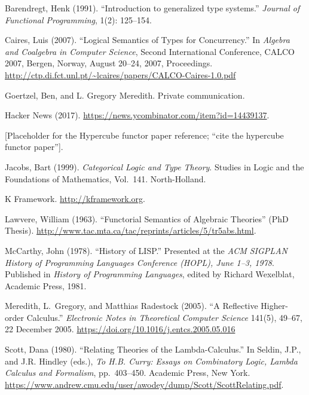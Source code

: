 \documentclass{article}
\begin{document}
\begin{thebibliography}{99}

Barendregt, Henk (1991). 
``Introduction to generalized type systems.''  
\emph{Journal of Functional Programming}, 1(2): 125--154.

Caires, Luis (2007). 
``Logical Semantics of Types for Concurrency.'' 
In \emph{Algebra and Coalgebra in Computer Science}, 
Second International Conference, CALCO 2007, Bergen, Norway, August 20--24, 2007, Proceedings.
\url{http://ctp.di.fct.unl.pt/~lcaires/papers/CALCO-Caires-1.0.pdf}

Goertzel, Ben, and L. Gregory Meredith. Private communication.

Hacker News (2017). 
\url{https://news.ycombinator.com/item?id=14439137}.

[Placeholder for the Hypercube functor paper reference; “cite the hypercube functor paper”].

Jacobs, Bart (1999).  
\textit{Categorical Logic and Type Theory}.  
Studies in Logic and the Foundations of Mathematics, Vol.\ 141.  
North-Holland.

K Framework.
\url{http://kframework.org}.

Lawvere, William (1963). 
``Functorial Semantics of Algebraic Theories'' (PhD Thesis). 
\url{http://www.tac.mta.ca/tac/reprints/articles/5/tr5abs.html}.

McCarthy, John (1978). 
``History of LISP.'' 
Presented at the \textit{ACM SIGPLAN History of Programming Languages Conference (HOPL), June 1--3, 1978}.  
Published in \textit{History of Programming Languages},  
edited by Richard Wexelblat,  
Academic Press, 1981.

Meredith, L.~Gregory, and Matthias Radestock (2005). 
``A Reflective Higher-order Calculus.'' 
\emph{Electronic Notes in Theoretical Computer Science} 141(5), 49--67, 22 December 2005. 
\url{https://doi.org/10.1016/j.entcs.2005.05.016}

Scott, Dana (1980). 
``Relating Theories of the Lambda-Calculus.'' 
In Seldin, J.P., and J.R. Hindley (eds.), 
\textit{To H.B. Curry: Essays on Combinatory Logic, Lambda Calculus and Formalism},  
pp.\ 403--450. Academic Press, New York.  
\url{https://www.andrew.cmu.edu/user/awodey/dump/Scott/ScottRelating.pdf}.


\end{thebibliography}
\end{document}
